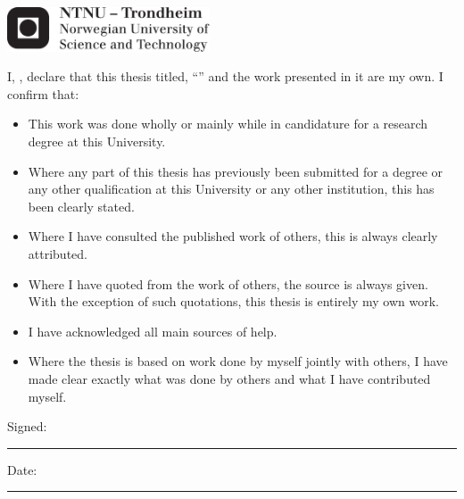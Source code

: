 \documentclass[
12pt, %
english, %
onehalfspacing, %
rnolistspacing, %
liststotoc, %
parskip, %
headsepline, %
]{MastersDoctoralThesis} %
\numberwithin{figure}{chapter}
\numberwithin{table}{chapter}
\begin{document}
\begin{titlepage}
\begin{center}
\vfill

\includegraphics[width=6cm]{Figures/Logo} %

\vfill
\end{center}
\end{titlepage}


\begin{declaration}
\addchaptertocentry{\authorshipname} %
\noindent I, \authorname, declare that this thesis titled, \enquote{\ttitle} and the work presented in it are my own. I confirm that:

\begin{itemize}
\item This work was done wholly or mainly while in candidature for a research degree at this University.
\item Where any part of this thesis has previously been submitted for a degree or any other qualification at this University or any other institution, this has been clearly stated.
\item Where I have consulted the published work of others, this is always clearly attributed.
\item Where I have quoted from the work of others, the source is always given. With the exception of such quotations, this thesis is entirely my own work.
\item I have acknowledged all main sources of help.
\item Where the thesis is based on work done by myself jointly with others, I have made clear exactly what was done by others and what I have contributed myself.\\
\end{itemize}

\noindent Signed:\\
\rule[0.5em]{25em}{0.5pt} %

\noindent Date:\\
\rule[0.5em]{25em}{0.5pt} %
\end{declaration}
\end{document}
